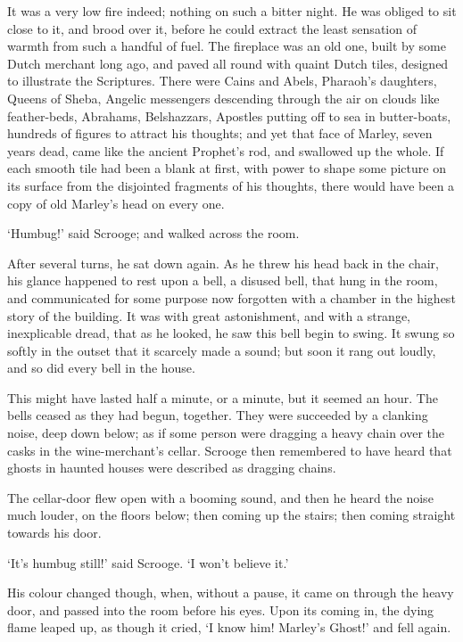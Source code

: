 \documentclass[11pt,twoside]{article}\makeatletter
\begin{document}
It was a very low fire indeed; nothing on such a bitter night.  He was obliged to sit close to it, and brood over it, before he could extract the least sensation of warmth from such a handful of fuel.  The fireplace was an old one, built by some Dutch merchant long ago, and paved all round with quaint Dutch tiles, designed to illustrate the Scriptures. There were Cains and Abels, Pharaoh's daughters, Queens of Sheba, Angelic messengers descending through the air on clouds like feather-beds, Abrahams, Belshazzars, Apostles putting off to sea in butter-boats, hundreds of figures to attract his thoughts; and yet that face of Marley, seven years dead, came like the ancient Prophet's rod, and swallowed up the whole.  If each smooth tile had been a blank at first, with power to shape some picture on its surface from the disjointed fragments of his thoughts, there would have been a copy of old Marley's head on every one.   \par
‘Humbug!’ said Scrooge; and walked across the room.  \par
After several turns, he sat down again.  As he threw his head back in the chair, his glance happened to rest upon a bell, a disused bell, that hung in the room, and communicated for some purpose now forgotten with a chamber in the highest story of the building.  It was with great astonishment, and with a strange, inexplicable dread, that as he looked, he saw this bell begin to swing.  It swung so softly in the outset that it scarcely made a sound; but soon it rang out loudly, and so did every bell in the house.  \par
This might have lasted half a minute, or a minute, but it seemed an hour.  The bells ceased as they had begun, together.  They were succeeded by a clanking noise, deep down below; as if some person were dragging a heavy chain over the casks in the wine-merchant's cellar.  Scrooge then remembered to have heard that ghosts in haunted houses were described as dragging chains.  \par
The cellar-door flew open with a booming sound, and then he heard the noise much louder, on the floors below; then coming up the stairs; then coming straight towards his door.  \par
‘It's humbug still!’ said Scrooge.  ‘I won't believe it.’  \par
His colour changed though, when, without a pause, it came on through the heavy door, and passed into the room before his eyes.  Upon its coming in, the dying flame leaped up, as though it cried, ‘I know him! Marley's Ghost!’ and fell again.  \par
\end{document}
